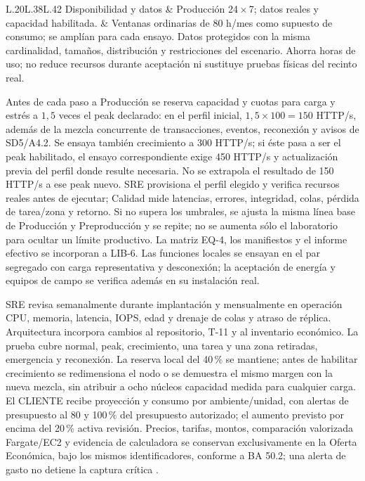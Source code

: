 \begin{longtable}{L{\dimexpr.20\tabcolsep\relax}L{\dimexpr.38\tabcolsep\relax}L{\dimexpr.42\tabcolsep\relax}}
Disponibilidad y datos & Producción 24\,$\times$\,7; datos reales y capacidad habilitada. & Ventanas ordinarias de 80 h/mes como supuesto de consumo; se amplían para cada ensayo. Datos protegidos con la misma cardinalidad, tamaños, distribución y restricciones del escenario. Ahorra horas de uso; no reduce recursos durante aceptación ni sustituye pruebas físicas del recinto real.\\\hline
\end{longtable}
\endgroup

Antes de cada paso a Producción se reserva capacidad y cuotas para carga y estrés a $1,5$ veces el peak declarado: en el perfil inicial, $1,5\times100=150$ HTTP/s, además de la mezcla concurrente de transacciones, eventos, reconexión y avisos de SD5/A4.2. Se ensaya también crecimiento a 300 HTTP/s; si éste pasa a ser el peak habilitado, el ensayo correspondiente exige 450 HTTP/s y actualización previa del perfil donde resulte necesaria. No se extrapola el resultado de 150 HTTP/s a ese peak nuevo. SRE provisiona el perfil elegido y verifica recursos reales antes de ejecutar; Calidad mide latencias, errores, integridad, colas, pérdida de tarea/zona y retorno. Si no supera los umbrales, se ajusta la misma línea base de Producción y Preproducción y se repite; no se aumenta sólo el laboratorio para ocultar un límite productivo. La matriz EQ-4, los manifiestos y el informe efectivo se incorporan a LIB-6. Las funciones locales se ensayan en el par segregado con carga representativa y desconexión; la aceptación de energía y equipos de campo se verifica además en su instalación real.

SRE revisa semanalmente durante implantación y mensualmente en operación CPU, memoria, latencia, IOPS, edad y drenaje de colas y atraso de réplica. Arquitectura incorpora cambios al repositorio, T-11 y al inventario económico. La prueba cubre normal, peak, crecimiento, una tarea y una zona retiradas, emergencia y reconexión. La reserva local del 40\,\% se mantiene; antes de habilitar crecimiento se redimensiona el nodo o se demuestra el mismo margen con la nueva mezcla, sin atribuir a ocho núcleos capacidad medida para cualquier carga. El CLIENTE recibe proyección y consumo por ambiente/unidad, con alertas de presupuesto al 80 y 100\,\% del presupuesto autorizado; el aumento previsto por encima del 20\,\% activa revisión. Precios, tarifas, montos, comparación valorizada Fargate/EC2 y evidencia de calculadora se conservan exclusivamente en la Oferta Económica, bajo los mismos identificadores, conforme a BA 50.2; una alerta de gasto no detiene la captura crítica \parencites[RT-02.10, p.~7; RT-03.06, p.~8; RT-15.01, p.~28]{pucv-transversal}[art.~50.2, p.~29]{pucv-admin}.
